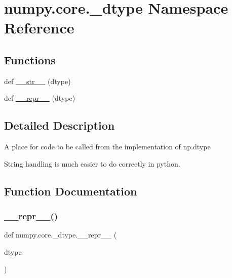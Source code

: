 \hypertarget{namespacenumpy_1_1core_1_1__dtype}{}\section{numpy.\+core.\+\_\+dtype Namespace Reference}
\label{namespacenumpy_1_1core_1_1__dtype}
\subsection*{Functions}
\begin{DoxyCompactItemize}
\item 
def \hyperlink{namespacenumpy_1_1core_1_1__dtype_a88687d701027dd0396e44cc9c5c7c556}{\+\_\+\+\_\+str\+\_\+\+\_\+} (dtype)
\item 
def \hyperlink{namespacenumpy_1_1core_1_1__dtype_a2406074cb19654a7f4c5b1ba87a2b3be}{\+\_\+\+\_\+repr\+\_\+\+\_\+} (dtype)
\end{DoxyCompactItemize}


\subsection{Detailed Description}
\begin{DoxyVerb}A place for code to be called from the implementation of np.dtype

String handling is much easier to do correctly in python.
\end{DoxyVerb}
 

\subsection{Function Documentation}
\mbox{\label{namespacenumpy_1_1core_1_1__dtype_a2406074cb19654a7f4c5b1ba87a2b3be}} 
\subsubsection{\texorpdfstring{\+\_\+\+\_\+repr\+\_\+\+\_\+()}{\_\_repr\_\_()}}
{\footnotesize\ttfamily def numpy.\+core.\+\_\+dtype.\+\_\+\+\_\+repr\+\_\+\+\_\+ (\begin{DoxyParamCaption}\item[{}]{dtype }\end{DoxyParamCaption})}


